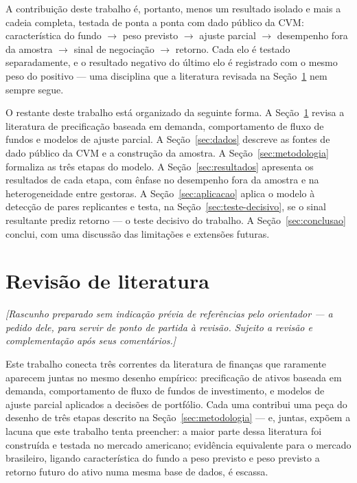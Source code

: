 \documentclass[11pt,a4paper]{article}
\begin{document}
A contribuição deste trabalho é, portanto, menos um resultado isolado e mais a cadeia completa,
testada de ponta a ponta com dado público da CVM: característica do fundo $\to$ peso previsto
$\to$ ajuste parcial $\to$ desempenho fora da amostra $\to$ sinal de negociação $\to$ retorno.
Cada elo é testado separadamente, e o resultado negativo do último elo é registrado com o mesmo
peso do positivo --- uma disciplina que a literatura revisada na Seção~\ref{sec:revisao} nem
sempre segue.

O restante deste trabalho está organizado da seguinte forma. A Seção~\ref{sec:revisao} revisa a
literatura de precificação baseada em demanda, comportamento de fluxo de fundos e modelos de
ajuste parcial. A Seção~\ref{sec:dados} descreve as fontes de dado público da CVM e a construção
da amostra. A Seção~\ref{sec:metodologia} formaliza as três etapas do modelo. A
Seção~\ref{sec:resultados} apresenta os resultados de cada etapa, com ênfase no desempenho fora
da amostra e na heterogeneidade entre gestoras. A Seção~\ref{sec:aplicacao} aplica o modelo à
detecção de pares replicantes e testa, na Seção~\ref{sec:teste-decisivo}, se o sinal resultante
prediz retorno --- o teste decisivo do trabalho. A Seção~\ref{sec:conclusao} conclui, com uma
discussão das limitações e extensões futuras.

\section{Revisão de literatura}
\label{sec:revisao}

\emph{[Rascunho preparado sem indicação prévia de referências pelo orientador --- a pedido dele,
para servir de ponto de partida à revisão. Sujeito a revisão e complementação após seus
comentários.]}

Este trabalho conecta três correntes da literatura de finanças que raramente aparecem juntas no
mesmo desenho empírico: precificação de ativos baseada em demanda, comportamento de fluxo de
fundos de investimento, e modelos de ajuste parcial aplicados a decisões de portfólio. Cada uma
contribui uma peça do desenho de três etapas descrito na Seção~\ref{sec:metodologia} --- e,
juntas, expõem a lacuna que este trabalho tenta preencher: a maior parte dessa literatura foi
construída e testada no mercado americano; evidência equivalente para o mercado brasileiro,
ligando característica do fundo a peso previsto e peso previsto a retorno futuro do ativo numa
mesma base de dados, é escassa.
\end{document}
